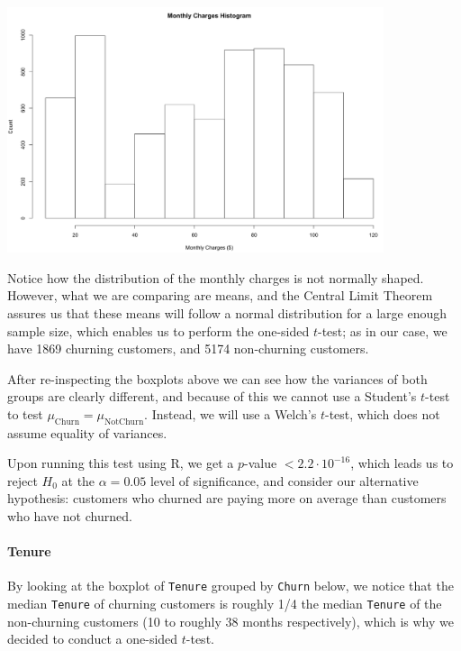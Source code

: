 \documentclass[man, floatsintext]{apa6}
\begin{document}
\noindent\begin{minipage}{0.54\textwidth}
\includegraphics[width = \linewidth, height = 72mm]{hist_MonthlyCharges}
\end{minipage}
\hfill
\begin{minipage}{0.43\textwidth} Notice how the distribution of the monthly charges is not normally shaped. However, what we are comparing are means, and the Central Limit Theorem assures us that these means will follow a normal distribution for a large enough sample size, which enables us to perform the one-sided $t$-test; as in our case, we have 1869 churning customers, and 5174 non-churning customers.
\end{minipage}

\hspace{0.5mm}

After re-inspecting the boxplots above we can see how the variances of both groups are clearly different, and because of this we cannot use a Student's $t$-test to test $\mu_{\text{Churn}} = \mu_{\text{NotChurn}}$. Instead, we will use a Welch's $t$-test, which does not assume equality of variances.

Upon running this test using R, we get a $p$-value $< 2.2 \cdot 10^{-16}$, which leads us to reject $H_0$ at the  $\alpha = 0.05$ level of significance, and consider our alternative hypothesis: customers who churned are paying more on average than customers who have not churned.

\newpage

\paragraph{Tenure}

By looking at the boxplot of \texttt{Tenure} grouped by \texttt{Churn} below, we notice that the median \texttt{Tenure} of churning customers is roughly 1/4 the median \texttt{Tenure} of the non-churning customers (10 to roughly 38 months respectively), which is why we decided to conduct a one-sided $t$-test.
\end{document}
